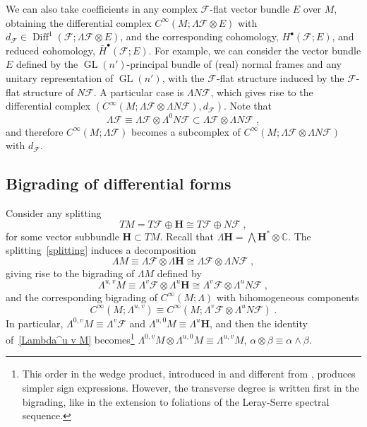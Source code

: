 \documentclass{memo-l}
\theoremstyle{plain}
\theoremstyle{definition}
\theoremstyle{remark}
\newcommand{\C}{\mathbb{C}}
\newcommand{\FF}{\mathcal{F}}
\newcommand{\bfH}{\boldsymbol{H}}
\newcommand{\Diff}{\operatorname{Diff}}
\newcommand{\GL}{\operatorname{GL}}
\numberwithin{section}{chapter}
\numberwithin{equation}{section}%
\begin{document}
We can also take coefficients in any complex $\FF$-flat vector bundle $E$ over $M$, obtaining the differential complex $C^\infty(M;\Lambda\FF\otimes E)$ with $d_\FF\in\Diff^1(\FF;\Lambda\FF\otimes E)$, and the corresponding cohomology, $H^\bullet(\FF;E)$, and reduced cohomology, $\bar H^\bullet(\FF;E)$. For example, we can consider the vector bundle $E$ defined by the $\GL(n')$-principal bundle of (real) normal frames and any unitary representation of $\GL(n')$, with the $\FF$-flat structure induced by the $\FF$-flat structure of $N\FF$. A particular case is $\Lambda N\FF$, which gives rise to the differential complex $(C^\infty(M;\Lambda\FF\otimes\Lambda N\FF),d_\FF)$. Note that
\begin{equation}\label{Lambda FF subset Lambda FF otimes Lambda N FF}
\Lambda\FF\equiv\Lambda\FF\otimes\Lambda^0N\FF\subset\Lambda\FF\otimes\Lambda N\FF\;,
\end{equation}
and therefore $C^\infty(M;\Lambda\FF)$ becomes a subcomplex of $C^\infty(M;\Lambda\FF\otimes\Lambda N\FF)$ with $d_\FF$.


\subsection{Bigrading of differential forms}\label{ss: bigrading}

Consider any splitting 
\begin{equation}\label{splitting}
TM=T\FF\oplus\bfH\cong T\FF\oplus N\FF\;,
\end{equation}
for some vector subbundle $\bfH\subset TM$. Recall that $\Lambda\bfH=\bigwedge\bfH^*\otimes\C$. The splitting~\eqref{splitting} induces a decomposition
\begin{equation}\label{Lambda M}
\Lambda M\equiv\Lambda\FF\otimes\Lambda\bfH\cong\Lambda\FF\otimes\Lambda N\FF\;,
\end{equation}
giving rise to the bigrading of $\Lambda M$ defined by 
\begin{equation}\label{Lambda^u v M}
\Lambda^{u,v}M\equiv\Lambda^v\FF\otimes\Lambda^u\bfH\cong\Lambda^v\FF\otimes\Lambda^uN\FF\;,
\end{equation}
and the corresponding bigrading of $C^\infty(M;\Lambda)$ with bihomogeneous components
\[
C^\infty(M;\Lambda^{u,v})\equiv C^\infty(M;\Lambda^v\FF\otimes\Lambda^uN\FF)\;.
\]
In particular, $\Lambda^{0,v}M\equiv\Lambda^v\FF$ and $\Lambda^{u,0}M\equiv\Lambda^u\bfH$, and then the identity of~\eqref{Lambda^u v M} becomes\footnote{This order in the wedge product, introduced in  \cite{AlvKordyLeichtnam2020} and different from \cite{AlvKordy2001}, produces simpler sign expressions. However, the transverse degree is written first in the bigrading, like in the extension to foliations of the Leray-Serre spectral sequence.} $\Lambda^{0,v}M\otimes\Lambda^{u,0}M\equiv\Lambda^{u,v}M$, $\alpha\otimes\beta\equiv\alpha\wedge\beta$.
\end{document}

